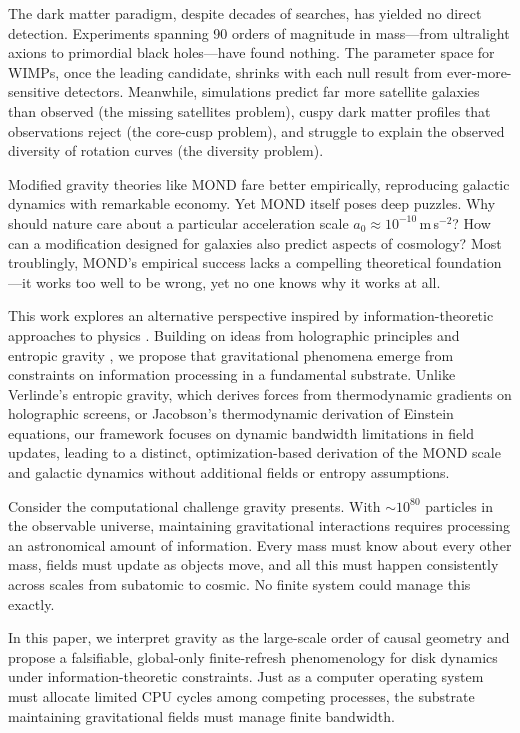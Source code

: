 \documentclass[usenatbib]{mnras}
\begin{document}
The dark matter paradigm, despite decades of searches, has yielded no direct detection. Experiments spanning 90 orders of magnitude in mass---from ultralight axions to primordial black holes---have found nothing. The parameter space for WIMPs, once the leading candidate, shrinks with each null result from ever-more-sensitive detectors. Meanwhile, simulations predict far more satellite galaxies than observed (the missing satellites problem), cuspy dark matter profiles that observations reject (the core-cusp problem), and struggle to explain the observed diversity of rotation curves (the diversity problem).

Modified gravity theories like MOND \citep{Milgrom1983} fare better empirically, reproducing galactic dynamics with remarkable economy. Yet MOND itself poses deep puzzles. Why should nature care about a particular acceleration scale $a_0 \approx 10^{-10}$\,m\,s$^{-2}$? How can a modification designed for galaxies also predict aspects of cosmology? Most troublingly, MOND's empirical success lacks a compelling theoretical foundation---it works too well to be wrong, yet no one knows why it works at all.

This work explores an alternative perspective inspired by information-theoretic approaches to physics \citep{Wheeler1990, Lloyd2002}. Building on ideas from holographic principles \citep{tHooft1993, susskind1995} and entropic gravity \citep{Verlinde2011, Jacobson1995}, we propose that gravitational phenomena emerge from constraints on information processing in a fundamental substrate. Unlike Verlinde's entropic gravity, which derives forces from thermodynamic gradients on holographic screens, or Jacobson's thermodynamic derivation of Einstein equations, our framework focuses on dynamic bandwidth limitations in field updates, leading to a distinct, optimization-based derivation of the MOND scale and galactic dynamics without additional fields or entropy assumptions.

Consider the computational challenge gravity presents. With $\sim 10^{80}$ particles in the observable universe, maintaining gravitational interactions requires processing an astronomical amount of information. Every mass must know about every other mass, fields must update as objects move, and all this must happen consistently across scales from subatomic to cosmic. No finite system could manage this exactly.

In this paper, we interpret gravity as the large-scale order of causal geometry and propose a falsifiable, global-only finite-refresh phenomenology for disk dynamics under information-theoretic constraints. Just as a computer operating system must allocate limited CPU cycles among competing processes, the substrate maintaining gravitational fields must manage finite bandwidth.
\end{document}
